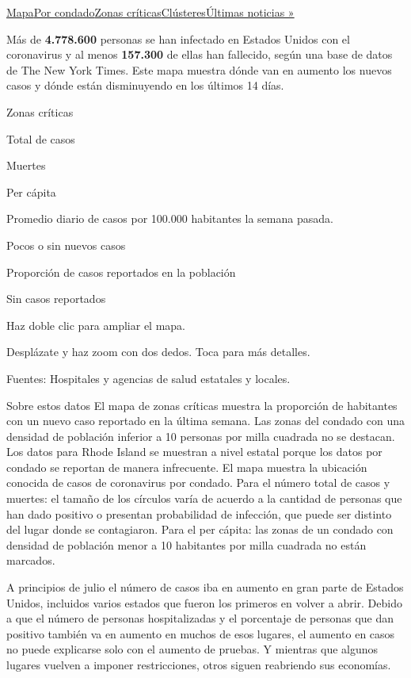 \protect\hyperlink{map}{Mapa}\protect\hyperlink{states}{Por
condado}\protect\hyperlink{hotspots}{Zonas
críticas}\protect\hyperlink{clusters}{Clústeres}\href{https://www.nytimes.com/2020/08/04/world/coronavirus-covid-19.html}{Últimas
noticias »}

Más de \textbf{4.778.600} personas se han infectado en Estados Unidos
con el coronavirus y al menos \textbf{157.300} de ellas han fallecido,
según una base de datos de The New York Times. Este mapa muestra dónde
van en aumento los nuevos casos y dónde están disminuyendo en los
últimos 14 días.

Zonas críticas

Total de casos

Muertes

Per cápita

Promedio diario de casos por 100.000 habitantes la semana pasada.

Pocos o sin nuevos casos

Proporción de casos reportados en la población

Sin casos reportados

Haz doble clic para ampliar el mapa.

Desplázate y haz zoom con dos dedos. Toca para más detalles.

Fuentes: Hospitales y agencias de salud estatales y locales.

Sobre estos datos El mapa de zonas críticas muestra la proporción de
habitantes con un nuevo caso reportado en la última semana. Las zonas
del condado con una densidad de población inferior a 10 personas por
milla cuadrada no se destacan. Los datos para Rhode Island se muestran a
nivel estatal porque los datos por condado se reportan de manera
infrecuente. El mapa muestra la ubicación conocida de casos de
coronavirus por condado. Para el número total de casos y muertes: el
tamaño de los círculos varía de acuerdo a la cantidad de personas que
han dado positivo o presentan probabilidad de infección, que puede ser
distinto del lugar donde se contagiaron. Para el per cápita: las zonas
de un condado con densidad de población menor a 10 habitantes por milla
cuadrada no están marcados.

A principios de julio el número de casos iba en aumento en gran parte de
Estados Unidos, incluidos varios estados que fueron los primeros en
volver a abrir. Debido a que el número de personas hospitalizadas y el
porcentaje de personas que dan positivo también va en aumento en muchos
de esos lugares, el aumento en casos no puede explicarse solo con el
aumento de pruebas. Y mientras que algunos lugares vuelven a imponer
restricciones, otros siguen reabriendo sus economías.

